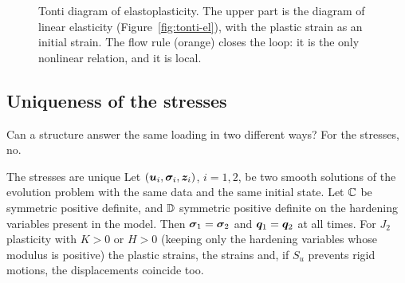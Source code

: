 \begin{figure}[h]
\centering
{}
\caption{Tonti diagram of elastoplasticity. The upper part is the diagram of
linear elasticity (Figure~\ref{fig:tonti-el}), with the plastic strain as an
initial strain. The flow rule (orange) closes the loop: it is the only
nonlinear relation, and it is local.}
\label{fig:pl-tonti}
\end{figure}

\subsection{Uniqueness of the stresses}\label{ssec:pl-unique}
%
Can a structure answer the same loading in two different ways? For the
stresses, no.
\begin{gbox}{The stresses are unique}\label{thm:pl-unique}
Let $(\bm{u}_i,\bm{\sigma}_i,\bm{z}_i)$, $i=1,2$, be two smooth solutions of the evolution
problem with the same data and the same initial state. Let $\mathbb{C}$ be
symmetric positive definite, and $\mathbb{D}$ symmetric positive definite on the
hardening variables present in the model. Then $\bm{\sigma}_1=\bm{\sigma}_2$ and
$\bm{q}_1=\bm{q}_2$ at all times. For $J_2$ plasticity with $K>0$ or $H>0$ (keeping
only the hardening variables whose modulus is positive) the
plastic strains, the strains and, if $S_u$ prevents rigid motions, the
displacements coincide too.
\end{gbox}
